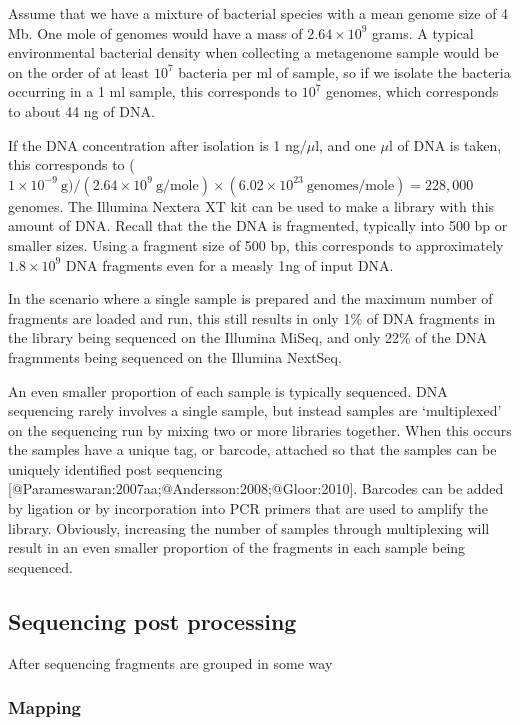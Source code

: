 \documentclass[
  onecolumn]{article}
\begin{document}
Assume that we have a mixture of bacterial species with a mean genome size of 4 Mb. One mole of genomes would have a mass of \(2.64 \times 10^9\) grams. A typical environmental bacterial density when collecting a metagenome sample would be on the order of at least \(10^7\) bacteria per ml of sample, so if we isolate the bacteria occurring in a 1 ml sample, this corresponds to \(10^7\) genomes, which corresponds to about 44 ng of DNA.

If the DNA concentration after isolation is 1 ng\(/ \mu\)l, and one \(\mu\)l of DNA is taken, this corresponds to (\(1\times 10^{-9} \mathrm{\ g}) / (2.64 \times 10^9\ \mathrm{g/mole}) \times (6.02 \times 10^{23} \mathrm{\ genomes/mole}) = 228,000\) genomes. The Illumina Nextera XT kit can be used to make a library with this amount of DNA. Recall that the the DNA is fragmented, typically into 500 bp or smaller sizes. Using a fragment size of 500 bp, this corresponds to approximately \(1.8 \times 10^9\) DNA fragments even for a measly 1ng of input DNA.

In the scenario where a single sample is prepared and the maximum number of fragments are loaded and run, this still results in only 1\% of DNA fragments in the library being sequenced on the Illumina MiSeq, and only 22\% of the DNA fragmments being sequenced on the Illumina NextSeq.

An even smaller proportion of each sample is typically sequenced. DNA sequencing rarely involves a single sample, but instead samples are `multiplexed' on the sequencing run by mixing two or more libraries together. When this occurs the samples have a unique tag, or barcode, attached so that the samples can be uniquely identified post sequencing {[}@Parameswaran:2007aa;@Andersson:2008;@Gloor:2010{]}. Barcodes can be added by ligation or by incorporation into PCR primers that are used to amplify the library. Obviously, increasing the number of samples through multiplexing will result in an even smaller proportion of the fragments in each sample being sequenced.

\hypertarget{sequencing-post-processing}{%
\subsection{Sequencing post processing}\label{sequencing-post-processing}}

After sequencing fragments are grouped in some way

\hypertarget{mapping}{%
\subsubsection{Mapping}\label{mapping}}
\end{document}
